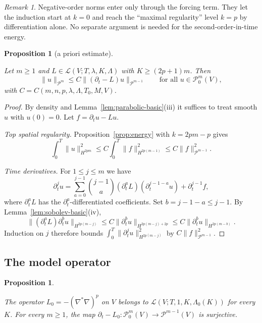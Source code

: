 \documentclass[11pt,reqno]{amsart}
\newtheorem{proposition}[theorem]{Proposition}
\theoremstyle{definition}
\theoremstyle{remark}
\newtheorem{remark}[theorem]{Remark}
\newcommand{\Pp}{\mathcal{P}}
\newcommand{\Lcl}{\mathcal{L}}
\newcommand{\norm}[1]{\lVert #1\rVert}
\newcommand{\Lap}{\nabla^{*}\nabla}
\newcommand{\lean}[1]{}
\newcommand{\uses}[1]{}
\numberwithin{equation}{section}
\begin{document}
\begin{remark}
Negative-order norms enter only through the forcing term. They let the induction start at $k=0$ and
reach the ``maximal regularity'' level $k=p$ by differentiation alone. No separate argument is needed
for the second-order-in-time energy.
\end{remark}

\begin{proposition}[a priori estimate]\label{prop:apriori}
\lean{ShortTime.apriori_estimate, ShortTime.parabolicInner_self_eq, ShortTime.LinearOp.exists_sobolevNormSq_timeDerivIter_apply_le, ShortTime.timeDerivIter_iteratedCovGrad}
\uses{def:class, def:parabolic}
Let $m\ge1$ and $L\in\Lcl(V;T,\lambda,K,\Lambda)$ with $K\ge(2p+1)m$. Then
\[
  \norm u_{\Pp^m}\le C\norm{(\partial_t-L)u}_{\Pp^{m-1}}\qquad\text{for all }u\in\Pp^m_0(V),
\]
with $C=C(m,n,p,\lambda,\Lambda,T_0,M,V)$.
\end{proposition}

\begin{proof}
\uses{prop:energy, lem:parabolic-basic, lem:sobolev-basic}
By density and Lemma~\ref{lem:parabolic-basic}(iii) it suffices to treat smooth $u$ with $u(0)=0$. Let
$f=\partial_tu-Lu$.

\emph{Top spatial regularity.} Proposition~\ref{prop:energy} with $k=2pm-p$ gives
\[
  \int_0^T\norm u^2_{H^{2pm}}\le C\int_0^T\norm f^2_{H^{2p(m-1)}}\le C\norm f_{\Pp^{m-1}}^2 .
\]

\emph{Time derivatives.} For $1\le j\le m$ we have
\[
  \partial_t^ju=\sum_{a=0}^{j-1}\binom{j-1}{a}(\partial_t^aL)(\partial_t^{j-1-a}u)+\partial_t^{j-1}f,
\]
where $\partial_t^aL$ has the $\partial_t^a$-differentiated coefficients. Set $b=j-1-a\le j-1$. By
Lemma~\ref{lem:sobolev-basic}(iv),
\[
  \norm{(\partial_t^aL)\partial_t^bu}_{H^{2p(m-j)}}\le C\norm{\partial_t^bu}_{H^{2p(m-j)+2p}}
  \le C\norm{\partial_t^bu}_{H^{2p(m-b)}} .
\]
Induction on $j$ therefore bounds $\int_0^T\norm{\partial_t^ju}_{H^{2p(m-j)}}^2$ by
$C\norm f_{\Pp^{m-1}}^2$.
\end{proof}

\subsection{The model operator}

\begin{proposition}\label{prop:model}
\lean{ShortTime.LinearOp.exists_model, ShortTime.exists_polyharmonic, ShortTime.LinearOp.exists_solution_proj, ShortTime.LinearOp.approx_of_eigen, ShortTime.tendsto_integral_proj_sub, ShortTime.LinearOp.surjective_heatExt_of_approx}
\uses{def:class, def:parabolic}
The operator $L_0=-(\Lap)^p$ on $V$ belongs to $\Lcl(V;T,1,K,\Lambda_0(K))$ for every $K$. For every
$m\ge1$, the map $\partial_t-L_0\colon\Pp^m_0(V)\to\Pp^{m-1}(V)$ is surjective.
\end{proposition}
\end{document}
